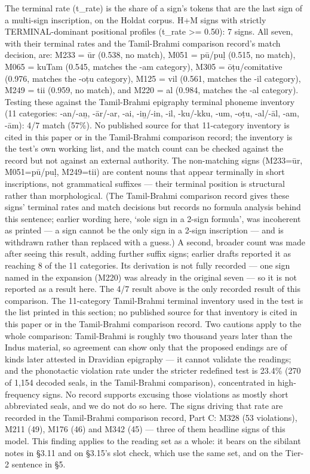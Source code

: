 \documentclass[11pt]{article}
\begin{document}
The terminal rate (t\_rate) is the share of a sign's tokens that are the last sign of a multi-sign inscription, on the Holdat corpus. H+M signs with strictly TERMINAL-dominant positional profiles (t\_rate \textgreater{}= 0.50): 7 signs. All seven, with their terminal rates and the Tamil-Brahmi comparison record's match decision, are: M233 = ūr (0.538, no match), M051 = pū/puḷ (0.515, no match), M065 = kuTam (0.545, matches the -am category), M305 = ōṭu/comitative (0.976, matches the -oṭu category), M125 = vil (0.561, matches the -il category), M249 = tii (0.959, no match), and M220 = al (0.984, matches the -al category). Testing these against the Tamil-Brahmi epigraphy terminal phoneme inventory (11 categories: -an/-aṉ, -ār/-ar, -ai, -iṉ/-in, -il, -ku/-kku, -um, -oṭu, -al/-āl, -am, -ām): 4/7 match (57\%). No published source for that 11-category inventory is cited in this paper or in the Tamil-Brahmi comparison record; the inventory is the test's own working list, and the match count can be checked against the record but not against an external authority. The non-matching signs (M233=ūr, M051=pū/puḷ, M249=tii) are content
nouns that appear terminally in short inscriptions, not grammatical
suffixes --- their terminal position is structural rather than morphological. (The Tamil-Brahmi comparison record gives these signs' terminal rates and match decisions but records no formula analysis behind this sentence; earlier wording here, `sole sign in a 2-sign formula', was incoherent as printed --- a sign cannot be the only sign in a 2-sign inscription --- and is withdrawn rather than replaced with a guess.) A second, broader count was made after seeing this result, adding further suffix signs; earlier drafts reported it as reaching 8 of the 11 categories. Its derivation is not fully recorded --- one sign named in the expansion (M220) was already in the original seven --- so it is not reported as a result here. The 4/7 result above is the only recorded result of this comparison. The 11-category Tamil-Brahmi terminal inventory used in the test is the list printed in this section; no published source for that inventory is cited in this paper or in the Tamil-Brahmi comparison record. Two cautions apply to the whole comparison: Tamil-Brahmi is roughly two thousand years later than the Indus material, so agreement can show only that the proposed endings are of kinds later attested in Dravidian epigraphy --- it cannot validate the readings; and the phonotactic violation rate under the stricter redefined test is 23.4\% (270 of 1,154 decoded seals, in the Tamil-Brahmi comparison), concentrated in high-frequency signs. No record supports excusing those violations as mostly short abbreviated seals, and we do not do so here. The signs driving that rate are recorded in the Tamil-Brahmi comparison record, Part C: M328 (53 violations), M211 (49), M176 (46) and M342 (45) --- three of them headline signs of this model. This finding applies to the reading set as a whole: it bears on the sibilant notes in §3.11 and on §3.15's slot check, which use the same set, and on the Tier-2 sentence in §5.
\end{document}
